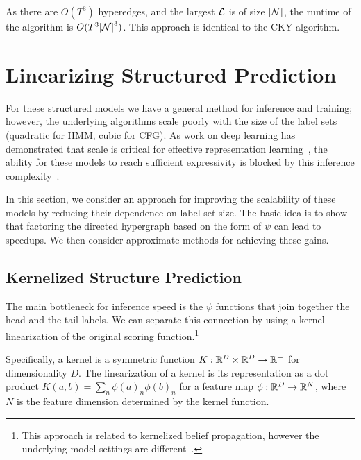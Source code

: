 \documentclass{article}
\begin{document}

As there are $O(T^3)$ hyperedges, and the largest ${\cal L}$ is of size
$|\mathcal{N}|$, the runtime of the algorithm is $O(T^3 {|\cal N|}^3)$. This approach is identical to the CKY algorithm.


\section{Linearizing Structured Prediction}

For these structured models we have a general method for inference and training; however, the underlying algorithms scale poorly with the size of the label sets (quadratic for HMM, cubic for CFG).
As work on deep learning has demonstrated that scale is critical for effective representation learning~\citep{gpt3}, the ability for these models to
reach sufficient expressivity is blocked by this inference complexity~\citep{chiu2020scaling}.

In this section, we consider an approach for improving the scalability
of these models by reducing their dependence on label set size. The basic idea is to show that factoring the directed hypergraph
based on the form of $\psi$ can lead to speedups. We then
consider approximate methods for achieving these gains.


\subsection{Kernelized Structure Prediction}

The main bottleneck for inference speed is the $\psi$ functions that join together the head and the tail labels. 
We can separate this connection by using a kernel linearization of the original scoring function.\footnote{This approach is related to kernelized belief propagation, however the underlying model settings are different~\citep{song2011kernelbp}.}

Specifically, a kernel is a symmetric function
$K : {\mathbb{R}^D} \times {\mathbb{R}^D} \to \mathbb{R}^+$ for dimensionality $D$.
The linearization of a kernel is its representation as a dot product $K(a, b) = \sum_n \phi(a)_n  \phi(b)_n$ for a feature map $\phi : {\mathbb{R}^D} \to \mathbb{R}^N$, where $N$ is the feature
dimension determined by the kernel function.
\end{document}
